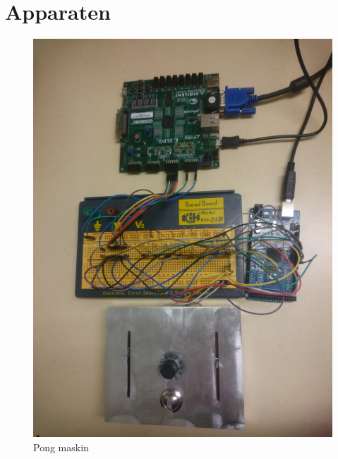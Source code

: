 \section{Apparaten}
\begin{center}
	\begin{figure}[H]
    	\centering
		\includegraphics[scale=0.07]{../grafik/rapport-apparaten.JPG}
		\caption{Pong maskin}
		\label{fig:maskin}
	\end{figure}
\end{center}
